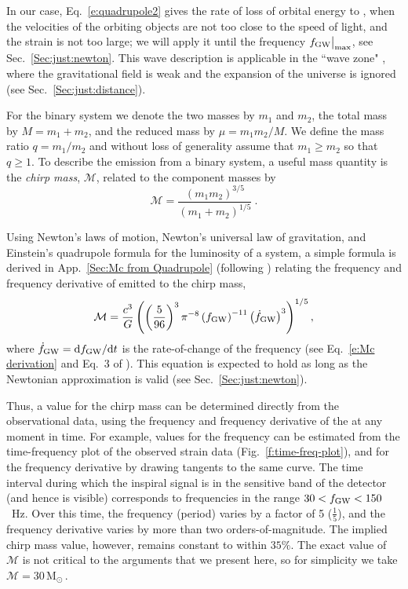 \documentclass{andp2012}%
\def\D{{\rm d}}
\def\({\left(}
\def\){\right)}
\newcommand{\inlinecite}[1]{\cite{#1}}
\newcommand{\inlinecites}[1]{\cite{#1}}
\newcommand{\refigure}[1]{Fig.~\ref{#1}}
\newcommand{\refapp}[1]{App.\ \ref{#1}}
\newcommand{\refsec}[1]{Sec.\ \ref{#1}}
\newcommand{\refeqn}[1]{Eq.\ \ref{#1}}
\def\Mc{\mathcal{M}}
\def\fgw{f_{\rm GW}}
\def\submax{\big|_{\rm max}}
\def\fgwmax{f_{\rm GW} \submax}
\newcommand{\Msun}{\ensuremath{\mathrm{M}_\odot\,}}
\newcommand{\CHIRPFSTRAINPEAK}{\ensuremath{150}} %
\newcommand{\CHIRPMASSAPPROX}{\ensuremath{30\, \Msun}}
\begin{document}

In our case, \refeqn{e:quadrupole2}
gives the rate of loss of orbital energy to \GWsns,
when the velocities of the orbiting objects are not too close
to the speed of light,
and the strain is not too large\cite{Flanagan:2005yc};
we will apply it until the frequency $\fgwmax$,
see \refsec{Sec:just:newton}.
This wave description is applicable
in the ``wave zone" \cite{wavezone},
where the gravitational field is weak
and the expansion of the universe is ignored
(see \refsec{Sec:just:distance}).

For the binary system we denote the two masses by $m_1$ and $m_2$,
the total mass by $M=m_1 + m_2$,
and the reduced mass by $\mu = m_1 m_2 / M$.
We define the mass ratio $q=m_1/m_2$ and
without loss of generality assume that $m_1 \ge m_2$ so that $q \ge 1$.
To describe the \GW emission from a binary system, a useful mass quantity
is the {\it chirp mass}, $\Mc$, related to the component masses by
\begin{equation}
  \Mc= \frac{(m_1 m_2)^{3/5}}{(m_1 + m_2)^{1/5}} ~.
\label{e:Mc1}
\end{equation}

Using Newton's laws of motion, Newton's universal law of gravitation, and
Einstein's quadrupole formula for the \GW luminosity of a system, a
simple formula is derived in \refapp{Sec:Mc from Quadrupole}
(following \inlinecites{Peters:1963ux, Peters:1964qza})
relating the frequency and frequency derivative
of emitted \GWs to the chirp mass,
\begin{equation}
\label{e:Mc2}
\Mc = \frac{c^3}{G} \( \(\frac{5}{96}\)^{3} \pi^{-8} \(f_{\rm GW}\)^{-11} \(\dot{f}_{\rm GW}\)^{3} \)^{1/5} ,
\end{equation}
where $\dot{f}_{\rm GW} = \D f_{\rm GW}/\D t$ is the rate-of-change of the frequency
(see \refeqn{e:Mc derivation} and Eq.~3 of
\inlinecite{PhysRevLett.74.3515}).
This equation is expected to hold as long as the Newtonian approximation is valid
(see \refsec{Sec:just:newton}).

Thus, a value for the chirp mass can be determined
directly from the observational data,
using the frequency and frequency derivative
of the \GWs at any moment in time.
For example, values for the frequency can be estimated
from the time-frequency plot of the observed \GW strain data
(\refigure{f:time-freq-plot}),
and for the frequency derivative
by drawing tangents to the same curve.
The time interval during which
the inspiral signal is in
the sensitive band of the detector
(and hence is visible) corresponds to
\GW frequencies in the range
$30<\fgw<\CHIRPFSTRAINPEAK$~Hz.
Over this time,
the frequency (period) varies
by a factor of 5 ($\frac{1}{5}$),
and the frequency derivative varies
by more than two orders-of-magnitude.
The implied chirp mass value, however,
remains constant to within $35\%$.
The exact value of $\Mc$ is not critical
to the arguments that we present here,
so for simplicity we take
$\Mc = \CHIRPMASSAPPROX\!$.
\end{document}
